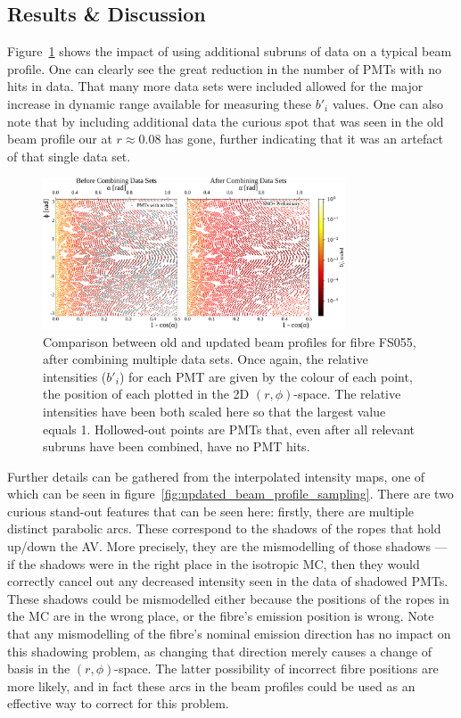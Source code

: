 \subsection{Results \& Discussion}\label{sect:results}
Figure~\ref{fig:updated_beam_profile} shows the impact of using additional subruns of data on a typical beam profile. One can clearly see the great reduction in the number of PMTs with no hits in data. That many more data sets were included allowed for the major increase in dynamic range available for measuring these $b'_{i}$ values. One can also note that by including additional data the curious spot that was seen in the old beam profile our at $r\approx0.08$ has gone, further indicating that it was an artefact of that single data set.
\begin{figure}
    \centering
    \includegraphics[width=0.8\textwidth]{5_SMELLIESimulation/images/flat_plot_r_comparison_FS055_old_vs_new_empty_circles.pdf}
    \caption{Comparison between old and updated beam profiles for fibre FS055, after combining multiple data sets. Once again, the relative intensities ($b'_{i}$) for each PMT are given by the colour of each point, the position of each plotted in the 2D $(r,\phi)$-space. The relative intensities have been both scaled here so that the largest value equals 1. Hollowed-out points are PMTs that, even after all relevant subruns have been combined, have no PMT hits.}
    \label{fig:updated_beam_profile}
\end{figure}

Further details can be gathered from the interpolated intensity maps, one of which can be seen in figure~\ref{fig:updated_beam_profile_sampling}. There are two curious stand-out features that can be seen here: firstly, there are multiple distinct parabolic arcs. These correspond to the shadows of the ropes that hold up/down the AV. More precisely, they are the mismodelling of those shadows --- if the shadows were in the right place in the isotropic MC, then they would correctly cancel out any decreased intensity seen in the data of shadowed PMTs. These shadows could be mismodelled either because the positions of the ropes in the MC are in the wrong place, or the fibre's emission position is wrong. Note that any mismodelling of the fibre's nominal emission direction has no impact on this shadowing problem, as changing that direction merely causes a change of basis in the $(r,\phi)$-space. The latter possibility of incorrect fibre positions are more likely, and in fact these arcs in the beam profiles could be used as an effective way to correct for this problem.

